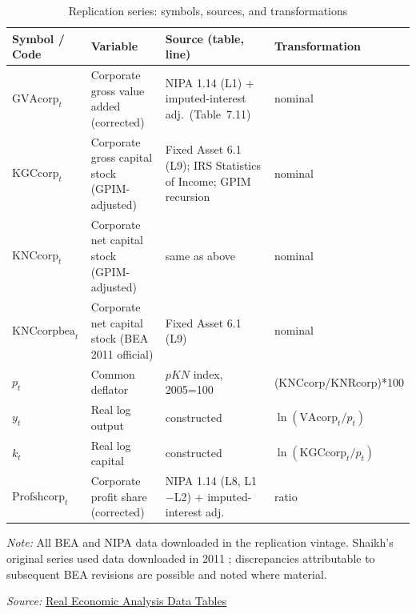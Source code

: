 \begin{table}[!ht]
\centering
\small
\setlength{\tabcolsep}{3pt}
\renewcommand{\arraystretch}{1.15}
\caption{Replication series: symbols, sources, and transformations}
\label{tab:app_glossary}
\begin{tabular}{@{} >{\raggedright\arraybackslash}p{}
 >{\raggedright\arraybackslash}p{}
 >{\raggedright\arraybackslash}p{}
 >{\raggedright\arraybackslash}p{}@{}}
\hline
Symbol / Code  & Variable  & Source (table, line)  & Transformation \\
\hline
$\text{GVAcorp}_t$
 & Corporate gross value added (corrected)
 & NIPA 1.14 (L1) + imputed-interest adj.\ (Table~7.11)
 & nominal \\[3pt]
$\text{KGCcorp}_t$
 & Corporate gross capital stock (GPIM-adjusted)
 & Fixed Asset 6.1 (L9); IRS Statistics of Income; GPIM recursion
 & nominal \\[3pt]
$\text{KNCcorp}_t$
 & Corporate net capital stock (GPIM-adjusted)
 & same as above
 & nominal \\[3pt]
$\text{KNCcorpbea}_t$
 & Corporate net capital stock (BEA 2011 official)
 & Fixed Asset 6.1 (L9)
 & nominal \\[3pt]
$p_t$
 & Common deflator
 & $pKN$ index, 2005=100
 & (KNCcorp/KNRcorp)*100 \\[3pt]
$y_t$
 & Real log output
 & constructed
 & $\ln(\text{VAcorp}_t/p_t)$ \\[3pt]
$k_t$
 & Real log capital
 & constructed
 & $\ln(\text{KGCcorp}_t/p_t)$ \\[3pt]
$\text{Profshcorp}_t$
 & Corporate profit share (corrected)
 & NIPA 1.14 (L8, L1$-$L2) + imputed-interest adj.
 & ratio \\
\hline
\end{tabular}
\par\vspace{0.4em}
\footnotesize\textit{Note:} All BEA and NIPA data downloaded in the replication vintage. Shaikh's original series used data downloaded in 2011 \citep[Appendix~6.7, fn.~1]{Shaikh2016}; discrepancies attributable to subsequent BEA revisions are possible and noted where material.
\par\vspace{0.2em}
\footnotesize \textit{Source:} \href{https://www.realecon.org/data}{Real Economic Analysis Data Tables}
\end{table}


